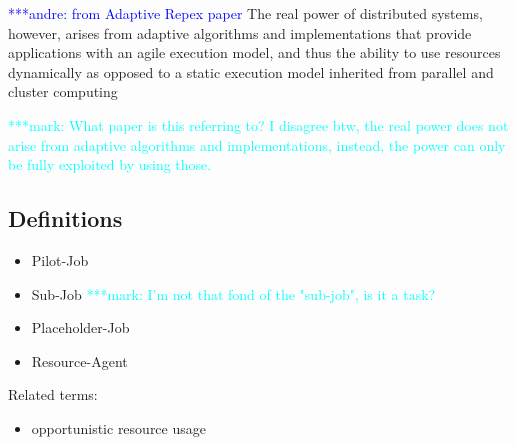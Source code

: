 \documentclass[]{article}
\newcommand{\alnote}[1]{ {\textcolor{blue} { ***andre: #1 }}}
\newcommand{\msnote}[1]{ {\textcolor{cyan} { ***mark: #1 }}}
\newcommand{\alnote}[1]{}
\begin{document}
\alnote{from Adaptive Repex paper}
The real power of distributed systems, however, arises from adaptive algorithms and
implementations that provide applications with an agile execution model,
and thus the ability to use resources dynamically as opposed to a static execution
model inherited from parallel and cluster computing

\msnote{What paper is this referring to? I disagree btw, the real power does not arise from adaptive algorithms and implementations, instead, the power can only be fully exploited by using those.}

\subsection{Definitions}

\begin{itemize}
	\item Pilot-Job
	\item Sub-Job
	\msnote{I'm not that fond of the "sub-job", is it a task?}
	\item Placeholder-Job
	\item Resource-Agent
\end{itemize}


Related terms:
\begin{itemize}
	\item opportunistic resource usage
\end{itemize}
\end{document}
